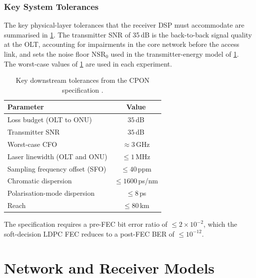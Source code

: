 \documentclass[12pt,a4paper]{report}
\begin{document}
\subsection{Key System Tolerances}
\label{sec:cpon_tolerances}

The key physical-layer tolerances that the receiver DSP must accommodate are summarised in \cref{tab:cpon_tolerances}. The transmitter SNR of 35\,dB is the back-to-back signal quality at the OLT, accounting for impairments in the core network before the access link, and sets the noise floor $\mathrm{NSR}_0$ used in the transmitter-energy model of \cref{chapter:energy}. The worst-case values of \cref{tab:cpon_tolerances} are used in each experiment.

\begin{table}[H]
    \centering
    \small
    \caption{Key downstream tolerances from the CPON specification \cite{CPON_PMD_2025}.}
    \label{tab:cpon_tolerances}
    \begin{tabular}{lc}
        \toprule
        Parameter & Value \\
        \midrule
        Loss budget (OLT to ONU)        & $35$\,dB \\
        Transmitter SNR                 & $35$\,dB \\
        Worst-case CFO                  & $\approx 3$\,GHz \\
        Laser linewidth (OLT and ONU)   & $\leq 1$\,MHz \\
        Sampling frequency offset (SFO) & $\leq 40$\,ppm \\
        Chromatic dispersion            & $\leq 1600$\,ps/nm \\
        Polarisation-mode dispersion    & $\leq 8$\,ps \\
        Reach                           & $\leq 80$\,km \\
        \bottomrule
    \end{tabular}
\end{table}

The specification requires a pre-FEC bit error ratio of $\leq 2\times10^{-2}$, which the soft-decision LDPC FEC reduces to a post-FEC BER of $\leq10^{-12}$.

\chapter{Network and Receiver Models}\label{chapter:energy}
\end{document}

